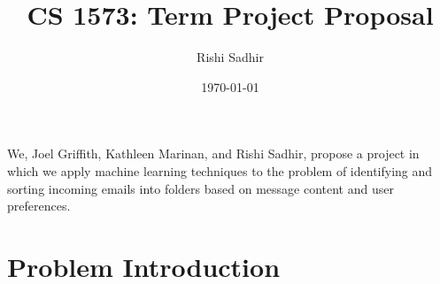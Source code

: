 \documentclass[11pt]{article}
\title{CS 1573: Term Project Proposal}
\author{Rishi Sadhir}
\date{\today}
\begin{document}
\maketitle

\setcounter{tocdepth}{3}
\tableofcontents
\vspace*{1cm}


We, Joel Griffith, Kathleen Marinan, and Rishi Sadhir, propose a project in which we apply machine learning techniques to the problem of identifying and sorting incoming emails into folders based on message content and user preferences.

\section{Problem Introduction}
\label{sec-1}
\end{document}
